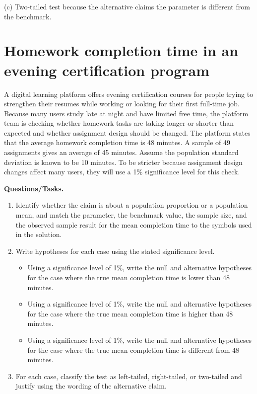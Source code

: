 \begin{ExamProblems}
		(c) Two-tailed test because the alternative claims the parameter is different from the benchmark.\TwoTailGraph
		
		\item
		\section{Homework completion time in an evening certification program}
		A digital learning platform offers evening certification courses for people trying to strengthen their resumes while working or looking for their first full-time job. Because many users study late at night and have limited free time, the platform team is checking whether homework tasks are taking longer or shorter than expected and whether assignment design should be changed. The platform states that the average homework completion time is 48 minutes. A sample of 49 assignments gives an average of 45 minutes. Assume the population standard deviation is known to be 10 minutes. To be stricter because assignment design changes affect many users, they will use a 1\% significance level for this check.
		
		\textbf{Questions/Tasks.}
		\begin{enumerate}
			\item[(C1)] Identify whether the claim is about a population proportion or a population mean, and match the parameter, the benchmark value, the sample size, and the observed sample result for the mean completion time to the symbols used in the solution.
			\item[(C2)] Write hypotheses for each case using the stated significance level.
			\begin{itemize}
				\item[(a)] Using a significance level of 1\%, write the null and alternative hypotheses for the case where the true mean completion time is lower than 48 minutes.
				\item[(b)] Using a significance level of 1\%, write the null and alternative hypotheses for the case where the true mean completion time is higher than 48 minutes.
				\item[(c)] Using a significance level of 1\%, write the null and alternative hypotheses for the case where the true mean completion time is different from 48 minutes.
			\end{itemize}
			\item[(C3)] For each case, classify the test as left-tailed, right-tailed, or two-tailed and justify using the wording of the alternative claim.
		\end{enumerate}
		

\end{ExamProblems}
